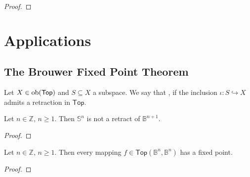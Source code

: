 \begin{proof}
	
\end{proof}


\section*{Applications}
\subsection*{The Brouwer Fixed Point Theorem}

\begin{definition}[Retract]
	Let $X \in \operatorname{ob}(\mathsf{Top})$ and $S \subseteq X$ a subspace. We say that ,  if the inclusion $\iota : S \hookrightarrow X$ admits a retraction in $\mathsf{Top}$.
\end{definition}

\begin{lemma}
	Let $n \in \mathbb{Z}$, $n \geq 1$. Then $\mathbb{S}^n$ is not a retract of $\mathbb{B}^{n + 1}$. 	
\end{lemma}

\begin{proof}
	
\end{proof}

\begin{theorem}
	Let $n \in \mathbb{Z}$, $n \geq 1$. Then every mapping $f \in \mathsf{Top}(\mathbb{B}^n,\mathbb{B}^n)$ has a fixed point.	
	\label{thm:brouwer_fixed_point}
\end{theorem}

\begin{proof}
	
\end{proof}
